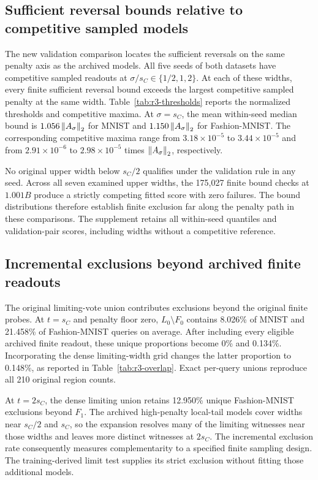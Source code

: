 \subsection{Sufficient reversal bounds relative to competitive sampled models}
\label{sec:r3-thresholds}
The new validation comparison locates the sufficient reversals on the same penalty axis as the archived models. All five seeds of both datasets have competitive sampled readouts at $\sigma/s_C\in\{1/2,1,2\}$. At each of these widths, every finite sufficient reversal bound exceeds the largest competitive sampled penalty at the same width. Table~\ref{tab:r3-thresholds} reports the normalized thresholds and competitive maxima. At $\sigma=s_C$, the mean within-seed median bound is $1.056\left\lVert A_\sigma\right\rVert_2$ for MNIST and $1.150\left\lVert A_\sigma\right\rVert_2$ for Fashion-MNIST. The corresponding competitive maxima range from $3.18\times10^{-5}$ to $3.44\times10^{-5}$ and from $2.91\times10^{-6}$ to $2.98\times10^{-5}$ times $\left\lVert A_\sigma\right\rVert_2$, respectively.



No original upper width below $s_C/2$ qualifies under the validation rule in any seed. Across all seven examined upper widths, the 175,027 finite bound checks at $1.001B$ produce a strictly competing fitted score with zero failures. The bound distributions therefore establish finite exclusion far along the penalty path in these comparisons. The supplement retains all within-seed quantiles and validation-pair scores, including widths without a competitive reference.

\subsection{Incremental exclusions beyond archived finite readouts}
\label{sec:r3-overlap}
The original limiting-vote union contributes exclusions beyond the original finite probes. At $t=s_C$ and penalty floor zero, $L_0\setminus F_0$ contains 8.026\% of MNIST and 21.458\% of Fashion-MNIST queries on average. After including every eligible archived finite readout, these unique proportions become 0\% and 0.134\%. Incorporating the dense limiting-width grid changes the latter proportion to 0.148\%, as reported in Table~\ref{tab:r3-overlap}. Exact per-query unions reproduce all 210 original region counts.



At $t=2s_C$, the dense limiting union retains 12.950\% unique Fashion-MNIST exclusions beyond $F_1$. The archived high-penalty local-tail models cover widths near $s_C/2$ and $s_C$, so the expansion resolves many of the limiting witnesses near those widths and leaves more distinct witnesses at $2s_C$. The incremental exclusion rate consequently measures complementarity to a specified finite sampling design. The training-derived limit test supplies its strict exclusion without fitting those additional models.

